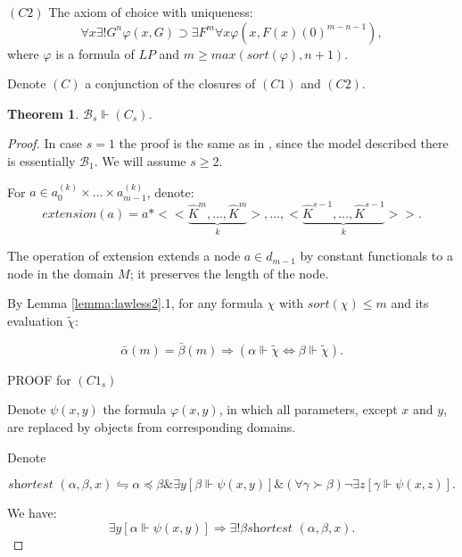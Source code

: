 \documentclass{asl}
\newtheorem{theorem}{Theorem}[section]
\theoremstyle{definition}
\begin{document}
$ (C2) $ The axiom of choice with uniqueness:  
\[ \forall x\exists!G^n \varphi(x,G)\supset\exists F^m\forall x\varphi(x,F(x)(0)^{m-n-1}), \] 
where $ \varphi $ is a formula of $ LP $ and $m \geqslant max(sort(\varphi),n+1) $. 

Denote $ (C) $ a conjunction of the closures of $ (C1) $ and $ (C2) $.

\begin{theorem}
$\mathcal{B}_s \Vdash (C_{s}) $.
\label{theorem:choice}
\end{theorem}

\begin{proof}
In case $ s=1 $ the proof is the same as in \cite{vand78}, since the model described there is essentially $\mathcal{B}_1$. We will assume $ s\geqslant 2 $.
\medskip

For $a\in a_0^{(k)} \times\ldots\times a_{m-1}^{(k)}$, denote:
\[extension(a)=a\ast<<\underbrace{
\widehat{K}^m,\ldots,\widehat{K}^m}_k>,\ldots,<\underbrace{\widehat{K}^{s-1},\ldots,\widehat{K}^{s-1}}_k >>.\]

The operation of extension extends a node $a\in d_{m-1}$ by constant functionals to a node in the domain $M$; it preserves the length of the node. 
\medskip

By Lemma \ref{lemma:lawless2}.1, for any formula $\chi $ with $ sort(\chi)\leqslant m $ and its evaluation $ \tilde{\chi} $:

\begin{equation}
\bar{\alpha}(m)=\bar{\beta}(m)\Rightarrow\left(\alpha\Vdash\tilde{\chi}\Leftrightarrow \beta\Vdash\tilde{\chi}\right).  
\label{eq:contraction}
\end{equation}
\medskip

\begin{center}
PROOF for $(C1_s)$
\end{center}

Denote $ \psi(x,y) $ the formula $ \varphi(x,y) $, in which all parameters, except $x$ and $y$, are replaced by objects from corresponding domains.

Denote 

\[ \textit{shortest }(\alpha,\beta,x)\leftrightharpoons \alpha\preccurlyeq \beta\& \exists y \left[\beta\Vdash \psi(x,y)\right]  \& (\forall \gamma \succ\beta)\neg \exists z \left[\gamma\Vdash \psi(x,z)\right]. \]

We have: 
\begin{equation}
\exists y \left[\alpha\Vdash \psi(x,y)\right] \Rightarrow \exists! \beta \textit{shortest }(\alpha,\beta,x).
\label{eq:shortest1}
\end{equation}


\end{proof}
\end{document}
